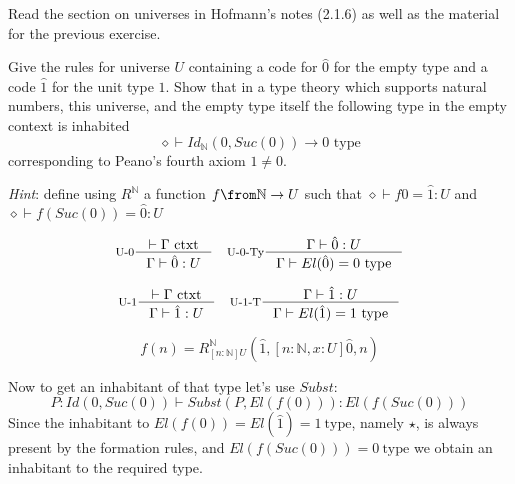 \begin{exercise}
  Read the section on universes in Hofmann's notes (2.1.6) as well as the
  material for the previous exercise.

  Give the rules for universe $U$ containing a code for $\hat{0}$ for the empty
  type and a code $\hat{1}$ for the unit type $1$. Show that in a type theory
  which supports natural numbers, this universe, and the empty type itself the
  following type in the empty context is inhabited
  \[
    \diamond \vdash Id_\mathbb{N}(0, Suc(0)) \to 0 \text{ type}
  \]
  corresponding to Peano's fourth axiom $1 \neq 0$.

  \emph{Hint}: define using $R^\mathbb{N}$ a function $f \from \mathbb{N} \to
  U$ such that $\diamond \vdash f 0 = \hat{1}: U$ and $\diamond \vdash
  f(Suc(0)) = \hat{0} : U$
\end{exercise}
\begin{answer}
  \[
    \inference[U-0]{\vdash \Gamma~\text{ctxt}}{\Gamma \vdash \hat{0} : U}\quad
    \inference[U-0-Ty]{\Gamma \vdash \hat{0}: U}{\Gamma \vdash El(\hat{0}) = 0~\text{type}}
  \]

  \[
    \inference[U-1]{\vdash \Gamma~\text{ctxt}}{\Gamma \vdash \hat{1} : U}\quad
    \inference[U-1-T]{\Gamma \vdash \hat{1} : U}{\Gamma \vdash El(\hat{1}) = 1~\text{type}}
  \]

  \[
    f(n) = R^\mathbb{N}_{[n:\mathbb{N}]U}(\hat{1}, [n: \mathbb{N}, x: U]\hat{0}, n)
  \]

  Now to get an inhabitant of that type let's use $\mathit{Subst}$:
  \[
    P : Id(0, Suc(0)) \vdash \mathit{Subst}(P, El(f(0))) : El(f(Suc(0)))
  \]
  Since the inhabitant to $El(f(0)) = El(\hat{1}) = 1~\text{type}$, namely
  $\star$, is always present by the formation rules, and $El(f(Suc(0))) =
  0~\text{type}$ we obtain an inhabitant to the required type.
\end{answer}



